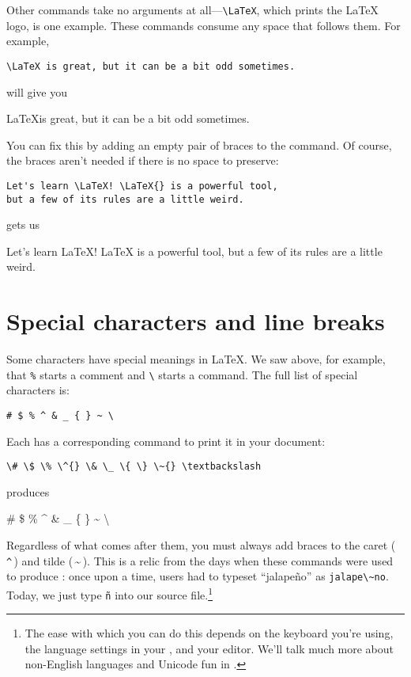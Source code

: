 Other commands take no arguments at all---\verb|\LaTeX|,
which prints the \LaTeX{} logo, is one example.
These commands consume any space that follows them.
For example,
\begin{leftfigure}
\begin{lstlisting}
\LaTeX is great, but it can be a bit odd sometimes.
\end{lstlisting}
\end{leftfigure}
will give you
\begin{leftfigure}
\lm \LaTeX is great, but it can be a bit odd sometimes.
\end{leftfigure}
You can fix this by adding an empty pair of braces to the command.
Of course, the braces aren't needed if there is no space to preserve:
\begin{leftfigure}
\begin{lstlisting}
Let's learn \LaTeX! \LaTeX{} is a powerful tool,
but a few of its rules are a little weird.
\end{lstlisting}
\end{leftfigure}
gets us
\begin{leftfigure}
\lm Let's learn \LaTeX! \LaTeX{} is a powerful tool,
but a few of its rules are a little weird.
\end{leftfigure}

\section{Special characters and line breaks}

Some characters have special meanings in \LaTeX.
We saw above, for example, that \verb|%| starts a comment
and \verb|\| starts a command.
The full list of special characters is:
\begin{leftfigure}
\begin{lstlisting}
# $ % ^ & _ { } ~ \
\end{lstlisting}
\end{leftfigure}
Each has a corresponding command
to print it in your document:
\begin{leftfigure}
\begin{lstlisting}
\# \$ \% \^{} \& \_ \{ \} \~{} \textbackslash
\end{lstlisting}
\end{leftfigure}
produces
\begin{leftfigure}
\lm \# \$ \% \^{} \& \_ \{ \} \~{} \textbackslash
\end{leftfigure}
Regardless of what comes after them, you must always add braces to
the caret (\,\texttt{\^{}}\,) and tilde (\,\~{}\,).
This is a relic from the days when these commands were used to produce
:
once upon a time, users had to typeset ``jalapeño'' as
\verb|jalape\~no|.
Today, we just type \texttt{ñ} into our source
file.\punckern\footnote{The ease with which you can do this depends
on the keyboard you're using, the language settings in your ,
and your editor.
We'll talk much more about non-English languages and Unicode fun
in .}


